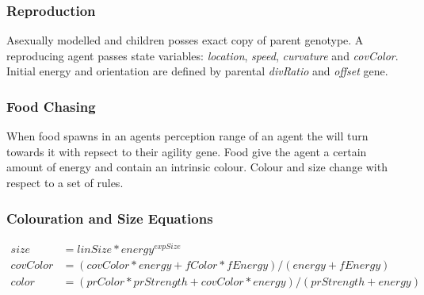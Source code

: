 \documentclass{article}
\begin{document}
\subsubsection*{Reproduction}
Asexually modelled and children posses exact copy of parent genotype. A reproducing agent passes state variables: \emph{location}, \emph{speed}, \emph{curvature} and \emph{covColor}. Initial energy and orientation are defined by parental \emph{divRatio} and \emph{offset} gene.
\subsubsection*{Food Chasing}
When food spawns in an agents perception range of an agent the will turn towards it with repsect to their agility gene.
Food give the agent a certain amount of energy and contain an intrinsic colour. Colour and size change with respect to a set of rules.
\subsubsection*{Colouration and Size Equations}
\begin{align*}
    size &= linSize * energy^{expSize}\\
    covColor &= (covColor * energy + fColor * fEnergy)/(energy + fEnergy)\\
    color &= (prColor * prStrength + covColor * energy)/(prStrength + energy)
\end{align*}
\newpage
\end{document}

